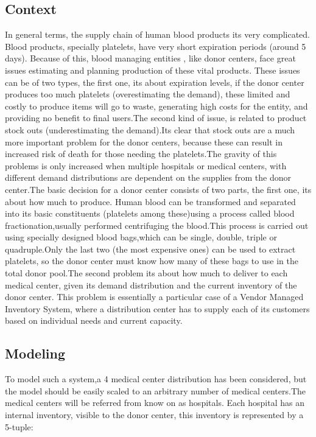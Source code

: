 \documentclass{elsarticle}
\begin{document}
	\subsection{Context}
		In general terms, the supply chain of human blood products its very complicated. Blood products, specially platelets, have very short expiration periods (around 5 days). Because of this, blood managing entities , like donor centers, face great issues estimating and planning production of these vital products. These issues can be of two types, the first one, its about expiration levels, if the donor center produces too much platelets (overestimating the demand), these limited and costly to produce items will go to waste, generating high costs for the entity, and providing no benefit to final users.The second kind of issue, is related to product stock outs (underestimating the demand).Its clear that stock outs are a much more important problem for the donor centers, because these can result in increased risk of death for those needing the platelets.The gravity of this problems is only increased when multiple hospitals or medical centers, with different demand distributions are dependent on the supplies from the donor center.The basic decision for a donor center consists of two parts, the first one, its about how much to produce. Human blood can be transformed and separated into its basic constituents (platelets among these)using a process called blood fractionation,usually performed centrifuging the blood.This process is carried out using specially designed blood bags,which can be single, double, triple or quadruple.Only the last two (the most expensive ones) can be used to extract platelets, so the donor center must know how many of these bags to use in the total donor pool.The second problem its about how much to deliver to each medical center, given its demand distribution and the current inventory of the donor center.
		This problem is essentially a particular case of a Vendor Managed Inventory System, where a distribution center has to supply each of its customers based on individual needs and current capacity.
		\subsection{Modeling}
		To model such a system,a 4 medical center distribution has been considered, but the model should be easily scaled to an arbitrary number of medical centers.The medical centers will be referred from know on as hospitals.
		Each hospital has an internal inventory, visible to the donor center, this inventory is represented by a 5-tuple:
		\def\layersep{2.5cm}
		
\end{document}
